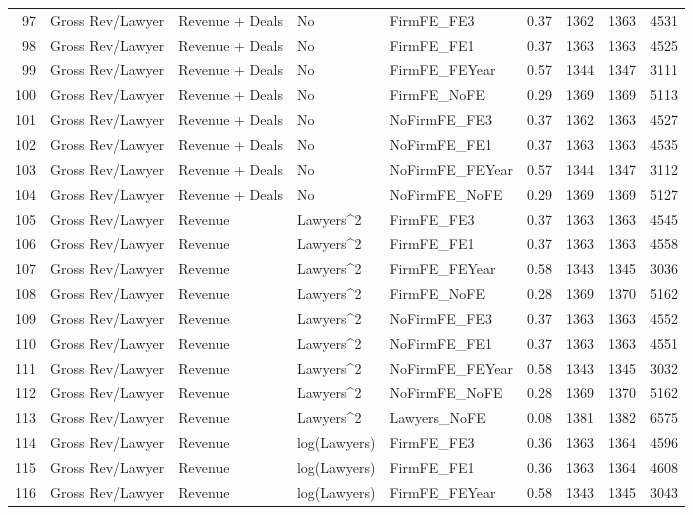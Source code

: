 \begin{table}[ht]
\begin{tabular}{rllllllll}
  97 & Gross Rev/Lawyer & Revenue + Deals & No & FirmFE\_FE3 & 0.37 & 1362 & 1363 & 4531 \\ 
  98 & Gross Rev/Lawyer & Revenue + Deals & No & FirmFE\_FE1 & 0.37 & 1363 & 1363 & 4525 \\ 
  99 & Gross Rev/Lawyer & Revenue + Deals & No & FirmFE\_FEYear & 0.57 & 1344 & 1347 & 3111 \\ 
  100 & Gross Rev/Lawyer & Revenue + Deals & No & FirmFE\_NoFE & 0.29 & 1369 & 1369 & 5113 \\ 
  101 & Gross Rev/Lawyer & Revenue + Deals & No & NoFirmFE\_FE3 & 0.37 & 1362 & 1363 & 4527 \\ 
  102 & Gross Rev/Lawyer & Revenue + Deals & No & NoFirmFE\_FE1 & 0.37 & 1363 & 1363 & 4535 \\ 
  103 & Gross Rev/Lawyer & Revenue + Deals & No & NoFirmFE\_FEYear & 0.57 & 1344 & 1347 & 3112 \\ 
  104 & Gross Rev/Lawyer & Revenue + Deals & No & NoFirmFE\_NoFE & 0.29 & 1369 & 1369 & 5127 \\ 
  105 & Gross Rev/Lawyer & Revenue & Lawyers^2 & FirmFE\_FE3 & 0.37 & 1363 & 1363 & 4545 \\ 
  106 & Gross Rev/Lawyer & Revenue & Lawyers^2 & FirmFE\_FE1 & 0.37 & 1363 & 1363 & 4558 \\ 
  107 & Gross Rev/Lawyer & Revenue & Lawyers^2 & FirmFE\_FEYear & 0.58 & 1343 & 1345 & 3036 \\ 
  108 & Gross Rev/Lawyer & Revenue & Lawyers^2 & FirmFE\_NoFE & 0.28 & 1369 & 1370 & 5162 \\ 
  109 & Gross Rev/Lawyer & Revenue & Lawyers^2 & NoFirmFE\_FE3 & 0.37 & 1363 & 1363 & 4552 \\ 
  110 & Gross Rev/Lawyer & Revenue & Lawyers^2 & NoFirmFE\_FE1 & 0.37 & 1363 & 1363 & 4551 \\ 
  111 & Gross Rev/Lawyer & Revenue & Lawyers^2 & NoFirmFE\_FEYear & 0.58 & 1343 & 1345 & 3032 \\ 
  112 & Gross Rev/Lawyer & Revenue & Lawyers^2 & NoFirmFE\_NoFE & 0.28 & 1369 & 1370 & 5162 \\ 
  113 & Gross Rev/Lawyer & Revenue & Lawyers^2 & Lawyers\_NoFE & 0.08 & 1381 & 1382 & 6575 \\ 
  114 & Gross Rev/Lawyer & Revenue & log(Lawyers) & FirmFE\_FE3 & 0.36 & 1363 & 1364 & 4596 \\ 
  115 & Gross Rev/Lawyer & Revenue & log(Lawyers) & FirmFE\_FE1 & 0.36 & 1363 & 1364 & 4608 \\ 
  116 & Gross Rev/Lawyer & Revenue & log(Lawyers) & FirmFE\_FEYear & 0.58 & 1343 & 1345 & 3043 \\ 

\end{tabular}
\end{table}
